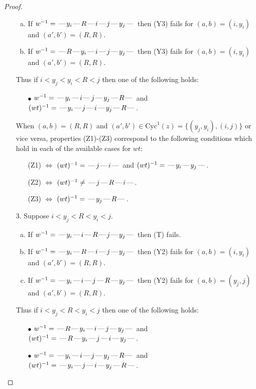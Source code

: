 \documentclass[10pt]{article}
\theoremstyle{definition}
\theoremstyle{definition}
\def\dash{\text{\hspace{0.5mm}---\hspace{0.5mm}}}
\def\Cyc{\mathrm{Cyc}}
\begin{document}
\begin{proof}
\begin{enumerate}
\begin{enumerate}[(a)]
\item If $w^{-1} = \dash y_i\dash R\dash i\dash j\dash y_j\dash $ then (Y3) fails for $(a,b)=(i,y_i)$ and $(a',b')=(R,R)$.
\item If $w^{-1} = \dash R\dash y_i\dash i\dash j\dash y_j\dash $ then (Y3) fails for $(a,b)=(i,y_i)$ and $(a',b')=(R,R)$.
\end{enumerate}
Thus if $i < y_j < y_i < R < j$ then one of the following holds:
\begin{enumerate}
\item[$\bullet$] $w^{-1} = \dash y_i\dash i\dash j\dash y_j\dash R\dash $ and $(wt)^{-1} = \dash y_i\dash j\dash i\dash y_j\dash R\dash $.
\end{enumerate}
When $(a,b)= (R,R)$ and $(a',b')\in \Cyc^1(z)=\{(y_j,y_i),(i,j)\}$ or vice versa,
properties (Z1)-(Z3) correspond to the following conditions which
hold in each of the available cases for $wt$:
\begin{enumerate}
\item[](Z1) $\Leftrightarrow$ $(wt)^{-1} = \dash j \dash i \dash$  and $(wt)^{-1} = \dash y_i \dash y_j \dash$.
\item[](Z2) $\Leftrightarrow$ $(wt)^{-1} \neq \dash j \dash R \dash i \dash$.
\item[](Z3) $\Leftrightarrow$ $(wt)^{-1} = \dash y_j \dash R \dash$.
\end{enumerate}
\item[$3$.] Suppose $i < y_j < R < y_i < j$.
\begin{enumerate}[(a)]
\item If $w^{-1} = \dash y_i\dash i\dash R\dash j\dash y_j\dash $ then (T) fails.
\item If $w^{-1} = \dash y_i\dash R\dash i\dash j\dash y_j\dash $ then (Y2) fails for $(a,b)=(i,y_i)$ and $(a',b')=(R,R)$.
\item If $w^{-1} = \dash y_i\dash i\dash j\dash R\dash y_j\dash $ then (Y2) fails for $(a,b)=(y_j,j)$ and $(a',b')=(R,R)$.
\end{enumerate}
Thus if $i < y_j < R < y_i < j$ then one of the following holds:
\begin{enumerate}
\item[$\bullet$] $w^{-1} = \dash R\dash y_i\dash i\dash j\dash y_j\dash $ and $(wt)^{-1} = \dash R\dash y_i\dash j\dash i\dash y_j\dash $.
\item[$\bullet$] $w^{-1} = \dash y_i\dash i\dash j\dash y_j\dash R\dash $ and $(wt)^{-1} = \dash y_i\dash j\dash i\dash y_j\dash R\dash $.
\end{enumerate}

\end{enumerate}
\end{proof}
\end{document}
